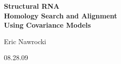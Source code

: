 \documentclass[landscape]{slides}
\begin{document}
\begin{slide}
\begin{center}
\large{\textbf{Structural RNA \\ Homology Search and Alignment
    \\ Using Covariance Models}}

\normalsize

Eric Nawrocki


08.28.09




\end{center}
\end{slide}
\end{document}
